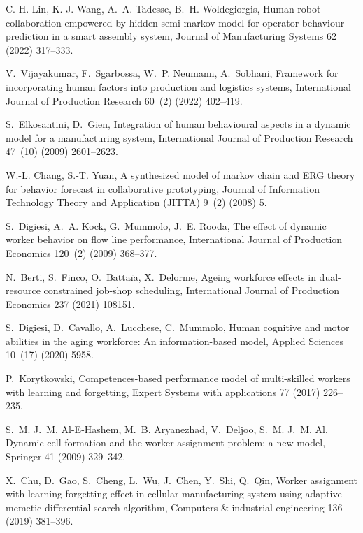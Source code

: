 \documentclass[review,12pt, 3p, times]{elsarticle}
\begin{document}
\begin{thebibliography}{10}
	C.-H. Lin, K.-J. Wang, A.~A. Tadesse, B.~H. Woldegiorgis, Human-robot
	collaboration empowered by hidden semi-markov model for operator behaviour
	prediction in a smart assembly system, Journal of Manufacturing Systems 62
	(2022) 317--333.
	
	V.~Vijayakumar, F.~Sgarbossa, W.~P. Neumann, A.~Sobhani, Framework for
	incorporating human factors into production and logistics systems,
	International Journal of Production Research 60~(2) (2022) 402--419.
	
	S.~Elkosantini, D.~Gien, Integration of human behavioural aspects in a dynamic
	model for a manufacturing system, International Journal of Production
	Research 47~(10) (2009) 2601--2623.
	
	W.-L. Chang, S.-T. Yuan, A synthesized model of markov chain and {ERG} theory
	for behavior forecast in collaborative prototyping, Journal of Information
	Technology Theory and Application (JITTA) 9~(2) (2008) 5.
	
	S.~Digiesi, A.~A. Kock, G.~Mummolo, J.~E. Rooda, {The effect of dynamic worker
		behavior on flow line performance}, International Journal of Production
	Economics 120~(2) (2009) 368--377.
	
	N.~Berti, S.~Finco, O.~Battaïa, X.~Delorme, Ageing workforce effects in
	dual-resource constrained job-shop scheduling, International Journal of
	Production Economics 237 (2021) 108151.
	
	S.~Digiesi, D.~Cavallo, A.~Lucchese, C.~Mummolo, Human cognitive and motor
	abilities in the aging workforce: An information-based model, Applied
	Sciences 10~(17) (2020) 5958.
	
	P.~Korytkowski, Competences-based performance model of multi-skilled workers
	with learning and forgetting, Expert Systems with applications 77 (2017)
	226--235.
	
	S.~M. J.~M. Al-E-Hashem, M.~B. Aryanezhad, V.~Deljoo, S.~M. J.~M. Al, Dynamic
	cell formation and the worker assignment problem: a new model, Springer 41
	(2009) 329--342.
	
	X.~Chu, D.~Gao, S.~Cheng, L.~Wu, J.~Chen, Y.~Shi, Q.~Qin, Worker assignment
	with learning-forgetting effect in cellular manufacturing system using
	adaptive memetic differential search algorithm, Computers \& industrial
	engineering 136 (2019) 381--396.
	

\end{thebibliography}
\end{document}
